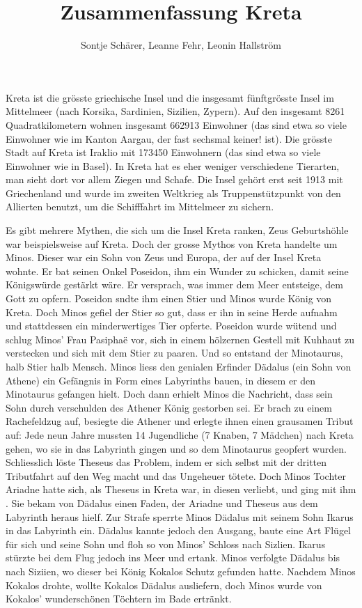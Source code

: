 \documentclass{article}
\begin{document}
\title{Zusammenfassung Kreta}
\author{Sontje Schärer, Leanne Fehr, Leonin Hallström}

\maketitle
Kreta ist die grösste griechische Insel und die insgesamt fünftgrösste Insel im Mittelmeer (nach Korsika, Sardinien, Sizilien, Zypern). Auf den
insgesamt 8261 Quadratkilometern wohnen insgesamt 662913 Einwohner (das sind etwa so viele Einwohner wie im Kanton Aargau, der fast sechsmal keiner!
ist). Die grösste Stadt auf Kreta ist Iraklio mit 173450 Einwohnern (das sind etwa so viele Einwohner wie in Basel). In Kreta hat es eher weniger
verschiedene Tierarten, man sieht dort vor allem Ziegen und Schafe. Die Insel gehört erst seit 1913 mit Griechenland und wurde im zweiten Weltkrieg als Truppenstützpunkt
von den Allierten benutzt, um die Schifffahrt im Mittelmeer zu sichern. 

Es gibt mehrere Mythen, die sich um die Insel Kreta ranken, Zeus Geburtshöhle
war beispielsweise auf Kreta. Doch der grosse Mythos von Kreta handelte um Minos. Dieser war ein Sohn von Zeus und Europa, der auf der Insel Kreta
wohnte. Er bat seinen Onkel Poseidon, ihm ein Wunder zu schicken, damit seine Königswürde gestärkt wäre. Er versprach, was immer dem Meer entsteige,
dem Gott zu opfern. Poseidon sndte ihm einen Stier und Minos wurde König von Kreta. Doch Minos gefiel der Stier so gut, dass er ihn in seine Herde
aufnahm und stattdessen ein minderwertiges Tier opferte. Poseidon wurde wütend und schlug Minos' Frau Pasiphaë vor, sich in einem hölzernen Gestell
mit Kuhhaut zu verstecken und sich mit dem Stier zu paaren. Und so entstand der Minotaurus, halb Stier halb Mensch. Minos liess den genialen Erfinder
Dädalus (ein Sohn von Athene) ein Gefängnis in Form eines Labyrinths bauen, in diesem er den Minotaurus gefangen hielt. Doch dann erhielt Minos die
Nachricht, dass sein Sohn durch verschulden des Athener König gestorben sei. Er brach zu einem Rachefeldzug auf, besiegte die Athener und erlegte
ihnen einen grausamen Tribut auf: Jede neun Jahre mussten 14 Jugendliche (7 Knaben, 7 Mädchen) nach Kreta gehen, wo sie in das Labyrinth gingen und so
dem Minotaurus geopfert wurden. Schliesslich löste Theseus das Problem, indem er sich selbst mit der dritten Tributfahrt auf den Weg macht und das
Ungeheuer tötete. Doch Minos Tochter Ariadne hatte sich, als Theseus in Kreta war, in diesen verliebt, und ging mit ihm . Sie bekam von Dädalus einen Faden, der Ariadne
und Theseus aus dem Labyrinth heraus hielf. Zur Strafe sperrte Minos Dädalus mit seinem Sohn Ikarus in das Labyrinth ein. Dädalus kannte jedoch den
Ausgang, baute eine Art Flügel für sich und seine Sohn und floh so von Minos' Schloss nach Sizlien. Ikarus stürzte bei dem Flug jedoch ins Meer und
ertank. Minos verfolgte Dädalus bis nach Siziien, wo dieser bei König Kokalos Schutz gefunden hatte. Nachdem Minos Kokalos drohte, wollte Kokalos
Dädalus ausliefern, doch Minos wurde von Kokalos' wunderschönen Töchtern im Bade ertränkt.
\end{document}
